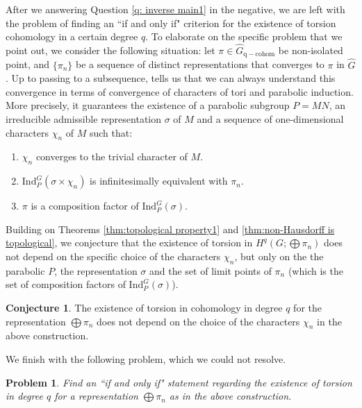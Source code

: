 \documentclass[12pt,reqno]{amsart}
\newtheorem{prob}[theorem]{Problem}
\theoremstyle{definition}
\newtheorem{conjecture}[theorem]{Conjecture}
\begin{document}
After we answering Question \ref{q: inverse main1} in the negative, we are left with the problem of finding an ``if and only if" criterion for the existence of torsion cohomology in a certain degree $q$. To elaborate on the specific problem that we point out, we consider the following situation: let $\pi \in \widehat{G}_\mathrm{q-cohom}$ be non-isolated point, and $\{\pi_n \}$ be a sequence of distinct representations that converges to $\pi$ in $\widehat{G}$. Up to passing to a subsequence, \cite[Theorem~3]{voganIsol} tells us that we can always understand this convergence in terms of convergence of characters of tori and parabolic induction. More precisely, it guarantees the existence of a parabolic subgroup $P=MN$, an irreducible admissible representation $\sigma$ of $M$ and a sequence of one-dimensional characters $\chi_n$ of $M$  such that:
\begin{enumerate}
    \item $\chi_n$ converges to the trivial character of $M$.
    \item $\mathrm{Ind}_P^G(\sigma \times \chi_n)$ is infinitesimally equivalent with $\pi_n$.
    \item $\pi$ is a composition factor of $\mathrm{Ind}_P^G(\sigma)$.
\end{enumerate}
Building on Theorems \ref{thm:topological property1} and \ref{thm:non-Hausdorff is topological}, we conjecture that the existence of torsion in $H^q(G;\bigoplus \pi_n)$ does not depend on the specific choice of the characters $\chi_n$, but only on the the parabolic $P$, the representation $\sigma$ and the set of limit points of $\pi_n$ (which is the set of composition factors of $\mathrm{Ind}_P^G(\sigma)$).
\begin{conjecture}\label{conj:torsionUltraTopological}
    The existence of torsion in cohomology in degree $q$ for the representation $\bigoplus \pi_n$ does not depend on the choice of the characters $\chi_n$ in the above construction.
\end{conjecture}
We finish with the following problem, which we could not resolve.
\begin{prob}\label{prob:remainingDetailed}
    Find an ``if and only if" statement regarding the existence of torsion in degree $q$ for a representation $\bigoplus \pi_n$ as in the above construction.
\end{prob}
\end{document}
